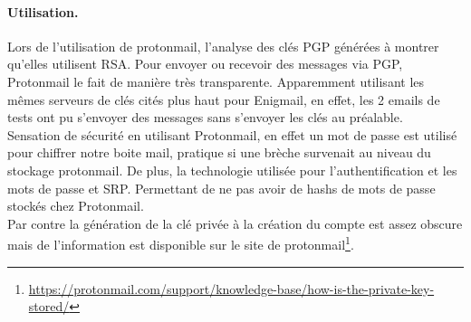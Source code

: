 \paragraph*{Utilisation.}
Lors de l'utilisation de protonmail, l'analyse des clés PGP générées à montrer qu'elles utilisent RSA. Pour envoyer ou recevoir des messages via PGP, Protonmail le fait de manière très transparente. Apparemment utilisant les mêmes serveurs de clés cités plus haut pour Enigmail, en effet, les 2 emails de tests ont pu s'envoyer des messages sans s'envoyer les clés au préalable.\\
Sensation de sécurité en utilisant Protonmail, en effet un mot de passe est utilisé pour chiffrer notre boite mail, pratique si une brèche survenait au niveau du stockage protonmail. De plus, la technologie utilisée pour l'authentification et les mots de passe et SRP. Permettant de ne pas avoir de hashs de mots de passe stockés chez Protonmail.\\
Par contre la génération de la clé privée à la création du compte est assez obscure mais de l'information est disponible sur le site de protonmail\footnote{\url{https://protonmail.com/support/knowledge-base/how-is-the-private-key-stored/}}.\\
